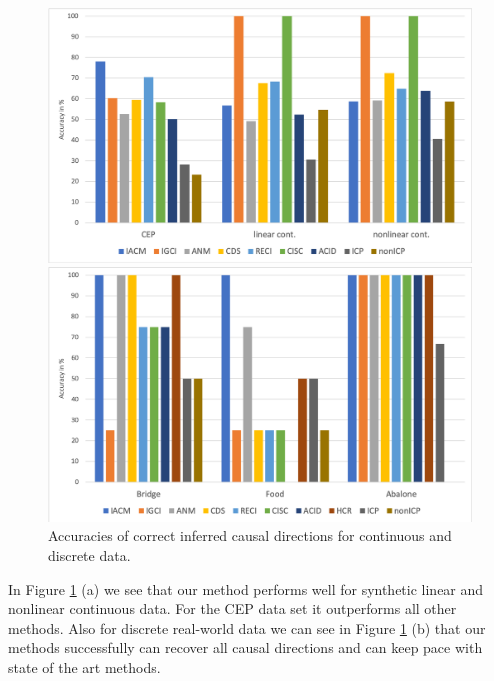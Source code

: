 \documentclass[letterpaper]{article}
\begin{document}
\begin{figure}[htb]
\begin{minipage}{\linewidth}
      \begin{minipage}{0.48\linewidth}
	      \centering
		  \includegraphics[scale=0.3]{results_cont_data.png}
      \end{minipage}
      \hfill
      \begin{minipage}{0.48\linewidth}
	      \centering
  		  \includegraphics[scale=0.3]{result_real_discrete.png}
      \end{minipage}
       \caption{Accuracies of correct inferred causal directions for continuous and discrete data.}
       \label{fig.real_world_results}
  \end{minipage}
\end{figure}

In Figure \ref{fig.real_world_results} (a) we see that our method performs well for synthetic linear and nonlinear continuous data. For the CEP data set it outperforms all other methods. Also for discrete real-world data we can see in Figure \ref{fig.real_world_results} (b) that our methods successfully can recover all causal directions and can keep pace with state of the art methods.
\end{document}
